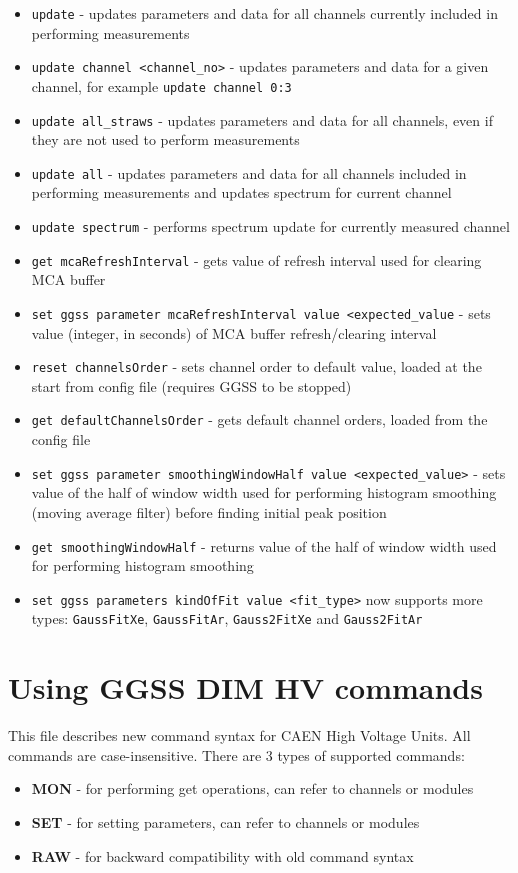 \begin{itemize}
    \item \lstinline{update} - updates parameters and data for all channels currently included in performing measurements
    \item \lstinline{update channel <channel_no>} - updates parameters and data for a given channel, for example \lstinline{update channel 0:3}
    \item \lstinline{update all_straws} - updates parameters and data for all channels, even if they are not used to perform measurements
    \item \lstinline{update all} - updates parameters and data for all channels included in performing measurements and updates spectrum for current channel
    \item \lstinline{update spectrum} - performs spectrum update for currently measured channel
    \item \lstinline{get mcaRefreshInterval} - gets value of refresh interval used for clearing MCA buffer
    \item \lstinline{set ggss parameter mcaRefreshInterval value <expected_value} - sets value (integer, in seconds) of MCA buffer refresh/clearing interval
    \item \lstinline{reset channelsOrder} - sets channel order to default value, loaded at the start from config file (requires GGSS to be stopped)
    \item \lstinline{get defaultChannelsOrder} - gets default channel orders, loaded from the config file
    \item \lstinline{set ggss parameter smoothingWindowHalf value <expected_value>} - sets value of the half of window width used for performing histogram smoothing (moving average filter) before finding initial peak position
    \item \lstinline{get smoothingWindowHalf} - returns value of the half of window width used for performing histogram smoothing
    \item \lstinline{set ggss parameters kindOfFit value <fit_type>} now supports more types: \lstinline{GaussFitXe}, \lstinline{GaussFitAr}, \lstinline{Gauss2FitXe} and \lstinline{Gauss2FitAr}
\end{itemize}

\clearpage
\section{Using GGSS DIM HV commands}
This file describes new command syntax for CAEN High Voltage Units. All commands are case-insensitive. There are 3 types of supported commands:
\begin{itemize}
    \item \textbf{MON} - for performing get operations, can refer to channels or modules
    \item \textbf{SET} - for setting parameters, can refer to channels or modules
    \item \textbf{RAW} - for backward compatibility with old command syntax
\end{itemize}

